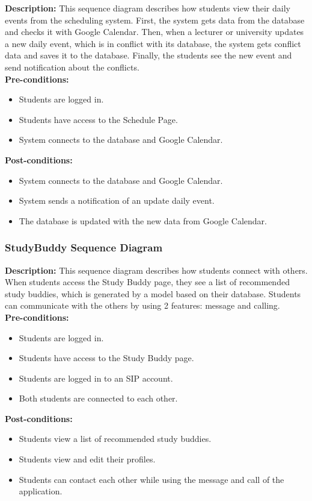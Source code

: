 \textbf{Description:} This sequence diagram describes how students view their daily events from the scheduling system. 
First, the system gets data from the database and checks it with Google Calendar. Then, when a lecturer or university updates a new daily event, which is in conflict with its database, the system gets conflict data and saves it to the database. 
Finally, the students see the new event and send notification about the conflicts. \\

\noindent \textbf{Pre-conditions:} 
    \begin{itemize}
        \item Students are logged in.
        \item Students have access to the Schedule Page.
        \item System connects to the database and Google Calendar.
    \end{itemize}

\noindent \textbf{Post-conditions:}
\begin{itemize}
    \item System connects to the database and Google Calendar.
    \item System sends a notification of an update daily event.
    \item The database is updated with the new data from Google Calendar.
\end{itemize}

\subsubsection{StudyBuddy Sequence Diagram}
\textbf{Description:} This sequence diagram describes how students connect with others. 
When students access the Study Buddy page, they see a list of recommended study buddies, which is generated by a model based on their database. 
Students can communicate with the others by using 2 features: message and calling. \\

\noindent \textbf{Pre-conditions:} 
    \begin{itemize}
        \item Students are logged in.
        \item Students have access to the Study Buddy page.
        \item Students are logged in to an SIP account.
        \item Both students are connected to each other.
    \end{itemize}
\noindent \textbf{Post-conditions:}
\begin{itemize}
    \item Students view a list of recommended study buddies.
    \item Students view and edit their profiles.
    \item Students can contact each other while using the message and call of the application.
\end{itemize}

